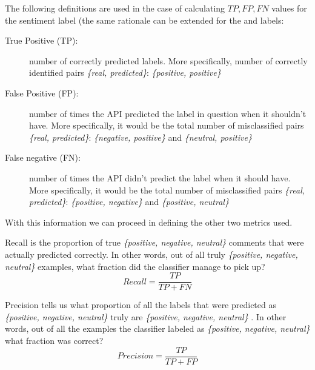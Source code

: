 \noindent The following definitions are used in the case of calculating $TP,FP,FN$ values for the  sentiment label (the same rationale can be extended for the  and  labels:
\begin{description}
 \item[True Positive (TP):] 
 number of correctly predicted labels. 
 More specifically, number of correctly identified pairs 
 \textit{\{real, predicted\}}: \textit{\{positive, positive\}}

 \item[False Positive (FP):]  
 number of times the API predicted the label in question when it shouldn't have.
 More specifically, it would be the total number of misclassified pairs 
 \textit{\{real, predicted\}}: \textit{\{negative, positive\}} and \textit{\{neutral, positive\}}

 \item[False negative (FN):] 
 number of times the API didn't predict the label when it should have. 
 More specifically, it would be the total number of misclassified pairs 
 \textit{\{real, predicted\}}: \textit{\{positive, negative\}} and \textit{\{positive, neutral\}}
\end{description}

With this information we can proceed in defining the other two metrics used.

Recall is the proportion of true \textit{\{positive, negative, neutral\}} comments that were actually predicted correctly. In other words, out of all truly \textit{\{positive, negative, neutral\}} examples, what fraction did the classifier manage to pick up?
\[Recall = \frac{TP}{TP + FN }\]


Precision tells us what proportion of all the labels that were predicted as \textit{\{positive, negative, neutral\}} truly are \textit{\{positive, negative, neutral\}} . In other words, out of all the examples the classifier labeled as \textit{\{positive, negative, neutral\}} what fraction was correct?
\[Precision = \frac{TP}{TP + FP }\]

